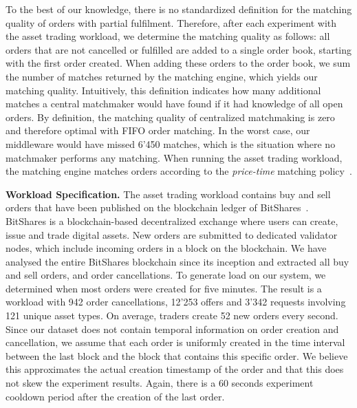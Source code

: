 To the best of our knowledge, there is no standardized definition for the matching quality of orders with partial fulfilment.
Therefore, after each experiment with the asset trading workload, we determine the matching quality as follows: all orders that are not cancelled or fulfilled are added to a single order book, starting with the first order created.
When adding these orders to the order book, we sum the number of matches returned by the matching engine, which yields our matching quality.
Intuitively, this definition indicates how many additional matches a central matchmaker would have found if it had knowledge of all open orders.
By definition, the matching quality of centralized matchmaking is zero and therefore optimal with FIFO order matching.
In the worst case, our middleware would have missed 6'450 matches, which is the situation where no matchmaker performs any matching.
When running the asset trading workload, the matching engine matches orders according to the \emph{price-time} matching policy~\cite{mavroudis2019libra}.

\textbf{Workload Specification.}
The asset trading workload contains buy and sell orders that have been published on the blockchain ledger of BitShares~\cite{schuh2017bitshares}.
BitShares is a blockchain-based decentralized exchange where users can create, issue and trade digital assets.
New orders are submitted to dedicated validator nodes, which include incoming orders in a block on the blockchain.
We have analysed the entire BitShares blockchain since its inception and extracted all buy and sell orders, and order cancellations.
To generate load on our system, we determined when most orders were created for five minutes.
The result is a workload with 942 order cancellations, 12'253 offers and 3'342 requests involving 121 unique asset types.
On average, traders create 52 new orders every second.
Since our dataset does not contain temporal information on order creation and cancellation, we assume that each order is uniformly created in the time interval between the last block and the block that contains this specific order.
We believe this approximates the actual creation timestamp of the order and that this does not skew the experiment results.
Again, there is a 60 seconds experiment cooldown period after the creation of the last order.

